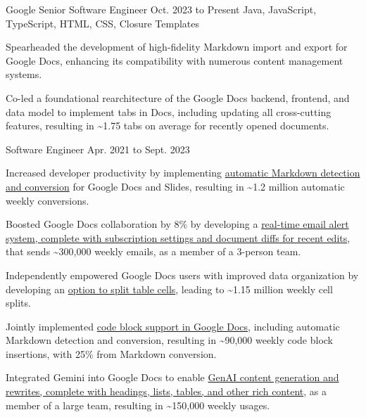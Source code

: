
\begin{cventry}
    {Google}
    {Senior Software Engineer}
    {Oct. 2023 to Present}
    {Java, JavaScript, TypeScript, HTML, CSS, Closure Templates}
    \begin{cvitems}
        \item Spearheaded the development of high-fidelity Markdown import and export for Google Docs, enhancing its compatibility with numerous content management systems.
        \item Co-led a foundational rearchitecture of the Google Docs backend, frontend, and data model to implement tabs in Docs, including updating all cross-cutting features, resulting in \~{}1.75 tabs on average for recently opened documents.
    \end{cvitems}
\end{cventry}

\begin{cventry}
    {}
    {Software Engineer}
    {Apr. 2021 to Sept. 2023}{}
    \begin{cvitems}
        \item Increased developer productivity by implementing \href{https://workspaceupdates.googleblog.com/2022/03/compose-with-markdown-in-google-docs-on.html}{automatic Markdown detection and conversion} for Google Docs and Slides, resulting in \~{}1.2 million automatic weekly conversions.
        \item Boosted Google Docs collaboration by 8\% by developing a \href{https://workspaceupdates.googleblog.com/2022/07/edit-notifications-for-document-content-changes.html}{real-time email alert system, complete with subscription settings and document diffs for recent edits}, that sends \~{}300,000 weekly emails, as a member of a 3-person team.
        \item Independently empowered Google Docs users with improved data organization by developing an \href{https://workspaceupdates.googleblog.com/2022/10/split-table-cells-in-google-docs.html}{option to split table cells}, leading to \~{}1.15 million weekly cell splits.
        \item Jointly implemented \href{https://workspaceupdates.googleblog.com/2022/12/format-display-code-google-docs.html}{code block support in Google Docs}, including automatic Markdown detection and conversion, resulting in \~{}90,000 weekly code block insertions, with 25\% from Markdown conversion.
        \item Integrated Gemini into Google Docs to enable \href{https://workspace.google.com/blog/product-announcements/generative-ai}{GenAI content generation and rewrites, complete with headings, lists, tables, and other rich content}, as a member of a large team, resulting in \~{}150,000 weekly usages.
    \end{cvitems}
\end{cventry}

